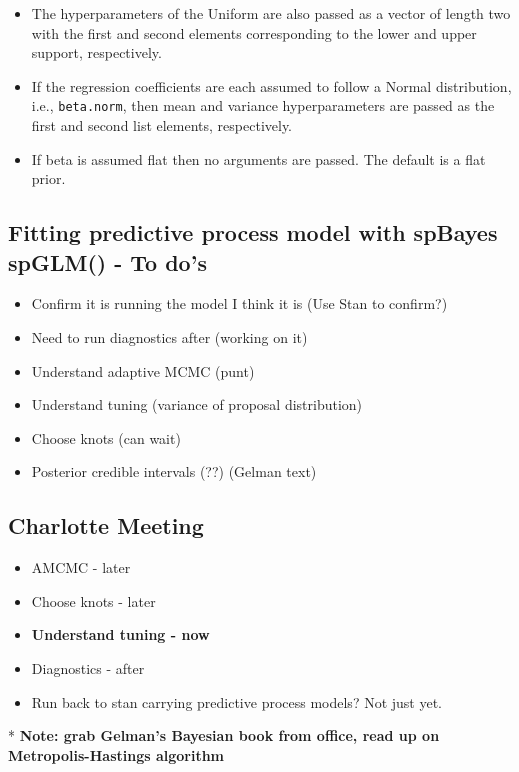 \documentclass{article}
\begin{document}
\begin{itemize}
\begin{itemize}
        \item The hyperparameters of the Uniform are also passed as a vector of length two with the first and second elements corresponding to the lower and upper support, respectively. 
        \item If the regression coefficients are each assumed to follow a Normal distribution, i.e., \verb|beta.norm|, then mean and variance hyperparameters are passed as the first and second list elements, respectively. 
        \item If beta is assumed flat then no arguments are passed. The default is a flat prior.
        \end{itemize}
\end{itemize}

\subsection*{Fitting predictive process model with spBayes spGLM() - To do's} %
\begin{itemize}
\item Confirm it is running the model I think it is (Use Stan to confirm?)
\item Need to run diagnostics after (working on it)
\item Understand adaptive MCMC (punt)
\item Understand tuning (variance of proposal distribution)
\item Choose knots \citep{Nychka1998} (can wait)
\item Posterior credible intervals (??) (Gelman text)
\end{itemize}

\subsection*{Charlotte Meeting} %
\begin{itemize}
\item AMCMC - later
\item Choose knots - later
\item {\bf Understand tuning - now}
\item Diagnostics - after
\item Run back to stan carrying predictive process models? Not just yet.
\end{itemize}

* {\bf Note: grab Gelman's Bayesian book from office, read up on Metropolis-Hastings algorithm} \\
\end{document}
